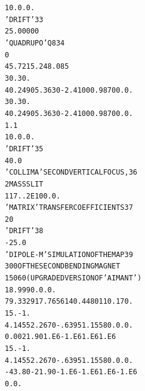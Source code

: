 \begin{tiny}
\begin{alltt}
    1  0. 0. 0.                                                                 
   'DRIFT'                                                                33
     25.00000                                                                   
   'QUADRUPO'                            Q8                               34
   0                                                        
    45.72  15.24  8.085                                                         
    30. 30.                                                                     
    4    0.2490   5.3630  -2.4100   0.9870   0.   0.                            
    30. 30.                                                                     
    4    0.2490   5.3630  -2.4100   0.9870   0.   0.                            
     1.1                                                                        
    1  0. 0. 0.                                                                 
   'DRIFT'                                                                35
     40.0                                                                       
   'COLLIMA'                           SECOND  VERTICAL  FOCUS,           36
    2                                  MASS  SLIT                             
   1  17.   .2E10   0. 0.                                                       
   'MATRIX'                            TRANSFER  COEFFICIENTS             37
   2 0                                                                          
   'DRIFT'                                                                38
   -25.0                                                                        
   'DIPOLE-M'                          SIMULATION  OF  THE  MAP           39
    3 0 0                              OF  THE  SECOND  BENDING  MAGNET       
    150  60                            (UPGRADED VERSION OF 'AIMANT')
    18.999   0. 0. 0.                                                                                             
     79.3329   17.7656  140.4480   110.  170.                                   
    15. -1.                                                                     
    4  .1455   2.2670  -.6395  1.1558  0. 0.  0.                                
    0.00    21.90  1.E6 -1.E6  1.E6  1.E6                                       
    15. -1.                                                                     
    4  .1455   2.2670  -.6395  1.1558  0. 0.  0.                                
   -43.80  -21.90 -1.E6 -1.E6  1.E6 -1.E6                                       
    0. 0.                                                                     

\end{alltt}
\end{tiny}
